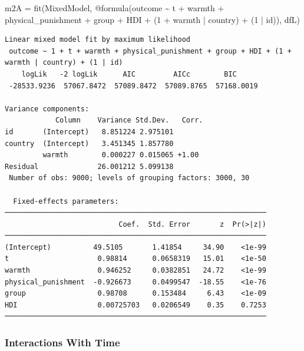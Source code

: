 \documentclass[
  letterpaper,
  DIV=11,
  numbers=noendperiod]{scrreprt}
\newenvironment{Shaded}{\begin{snugshade}}{\end{snugshade}}
\newcommand{\FloatTok}[1]{\textcolor[rgb]{0.68,0.00,0.00}{#1}}
\newcommand{\FunctionTok}[1]{\textcolor[rgb]{0.28,0.35,0.67}{#1}}
\newcommand{\NormalTok}[1]{\textcolor[rgb]{0.00,0.23,0.31}{#1}}
\newcommand{\OperatorTok}[1]{\textcolor[rgb]{0.37,0.37,0.37}{#1}}
\newcommand{\PreprocessorTok}[1]{\textcolor[rgb]{0.68,0.00,0.00}{#1}}
\begin{document}
\begin{Shaded}
\begin{Highlighting}[]

\NormalTok{m2A }\OperatorTok{=} \FunctionTok{fit}\NormalTok{(MixedModel, }\PreprocessorTok{@formula}\NormalTok{(outcome }\OperatorTok{\textasciitilde{}}\NormalTok{ t }\OperatorTok{+}\NormalTok{ warmth }\OperatorTok{+} 
\NormalTok{                                 physical\_punishment }\OperatorTok{+} 
\NormalTok{                                 group }\OperatorTok{+}\NormalTok{ HDI }\OperatorTok{+}
\NormalTok{                                 (}\FloatTok{1} \OperatorTok{+}\NormalTok{ warmth }\OperatorTok{|}\NormalTok{ country) }\OperatorTok{+}
\NormalTok{                                 (}\FloatTok{1} \OperatorTok{|}\NormalTok{ id)), dfL)}
\end{Highlighting}
\end{Shaded}

\begin{verbatim}
Linear mixed model fit by maximum likelihood
 outcome ~ 1 + t + warmth + physical_punishment + group + HDI + (1 + warmth | country) + (1 | id)
    logLik   -2 logLik      AIC         AICc        BIC     
 -28533.9236  57067.8472  57089.8472  57089.8765  57168.0019

Variance components:
            Column    Variance Std.Dev.   Corr.
id       (Intercept)   8.851224 2.975101
country  (Intercept)   3.451345 1.857780
         warmth        0.000227 0.015065 +1.00
Residual              26.001212 5.099138
 Number of obs: 9000; levels of grouping factors: 3000, 30

  Fixed-effects parameters:
──────────────────────────────────────────────────────────────
                           Coef.  Std. Error       z  Pr(>|z|)
──────────────────────────────────────────────────────────────
(Intercept)          49.5105       1.41854     34.90    <1e-99
t                     0.98814      0.0658319   15.01    <1e-50
warmth                0.946252     0.0382851   24.72    <1e-99
physical_punishment  -0.926673     0.0499547  -18.55    <1e-76
group                 0.98708      0.153484     6.43    <1e-09
HDI                   0.00725703   0.0206549    0.35    0.7253
──────────────────────────────────────────────────────────────
\end{verbatim}

\subsubsection{Interactions With Time}\label{interactions-with-time-2}
\end{document}
